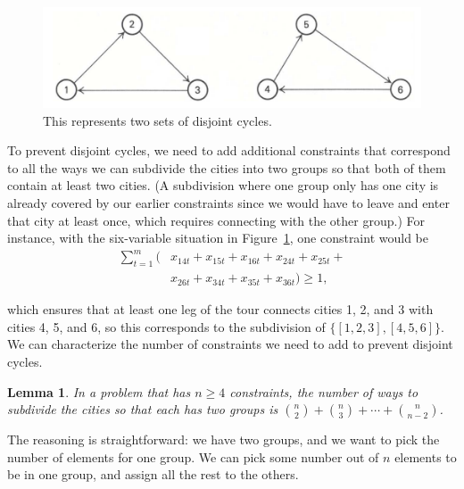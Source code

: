 \documentclass{article}
\newtheorem{lem}[thm]{Lemma}
\begin{document}
\begin{figure}[t]
\vskip 0.2in
\begin{center}
\centerline{\includegraphics[width=\columnwidth]{bad_solution}}
\caption{This represents two sets of disjoint cycles.}
\label{fig:bad_solution}
\end{center}
\vskip -0.2in
\end{figure}

To prevent disjoint cycles, we need to add additional constraints that correspond to all the ways we can subdivide the cities into two groups so that
both of them contain at least two cities. (A subdivision where one group only has one city is already covered by our earlier constraints since we
would have to leave and enter that city at least once, which requires connecting with the other group.) For instance, with the six-variable situation
in Figure~\ref{fig:bad_solution}, one constraint would be
\begin{align}
\sum_{t=1}^{m} (&x_{14t} + x_{15t} + x_{16t} + x_{24t} + x_{25t} + \\
& x_{26t} + x_{34t} + x_{35t} + x_{36t}) \ge 1, \nonumber
\end{align}

which ensures that at least one leg of the tour connects cities 1, 2, and 3 with cities 4, 5, and 6, so this corresponds to the subdivision of
$\{[1,2,3],[4,5,6]\}$. We can characterize the number of constraints we need to add to prevent disjoint cycles.

\begin{lem}\label{lem:cycle_constraints}
In a problem that has $n \ge 4$ constraints, the number of ways to subdivide the cities so that each has two groups is ${n \choose 2} + {n \choose 3}
+ \cdots + {n \choose n-2}$.
\end{lem}

The reasoning is straightforward: we have two groups, and we want to pick the number of elements for one group. We can pick some number out of $n$
elements to be in one group, and assign all the rest to the others.
\end{document}
